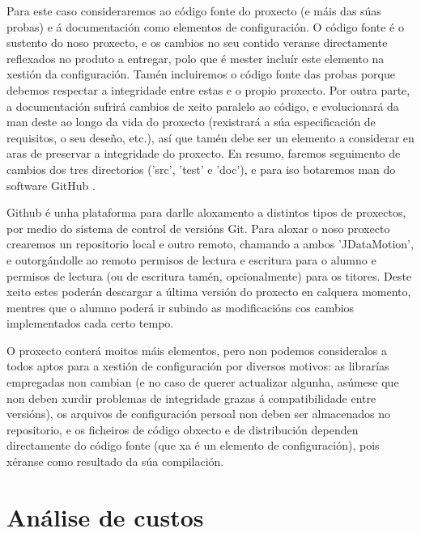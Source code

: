 Para este caso consideraremos ao código fonte do proxecto (e máis das súas probas) e á documentación como elementos de configuración. O código fonte é o sustento do noso proxecto, e os cambios no seu contido veranse directamente reflexados no produto a entregar, polo que é mester incluír este elemento na xestión da configuración. Tamén incluiremos o código fonte das probas porque debemos respectar a integridade entre estas e o propio proxecto. Por outra parte, a documentación sufrirá cambios de xeito paralelo ao código, e evolucionará da man deste ao longo da vida do proxecto (rexistrará a súa especificación de requisitos, o seu deseño, etc.), así que tamén debe ser un elemento a considerar en aras de preservar a integridade do proxecto. En resumo, faremos seguimento de cambios dos tres directorios ('src', 'test' e 'doc'), e para iso botaremos man do software GitHub \cite{github}.

Github é unha plataforma para darlle aloxamento a distintos tipos de proxectos, por medio do sistema de control de versións Git. Para aloxar o noso proxecto crearemos un repositorio local e outro remoto, chamando a ambos 'JDataMotion', e outorgándolle ao remoto permisos de lectura e escritura para o alumno e permisos de lectura (ou de escritura tamén, opcionalmente) para os titores. Deste xeito estes poderán descargar a última versión do proxecto en calquera momento, mentres que o alumno poderá ir subindo as modificacións cos cambios implementados cada certo tempo.

O proxecto conterá moitos máis elementos, pero non podemos consideralos a todos aptos para a xestión de configuración por diversos motivos: as librarías empregadas non cambian (e no caso de querer actualizar algunha, asúmese que non deben xurdir problemas de integridade grazas á compatibilidade entre versións), os arquivos de configuración persoal non deben ser almacenados no repositorio, e os ficheiros de código obxecto e de distribución dependen directamente do código fonte (que xa é un elemento de configuración), pois xéranse como resultado da súa compilación.

\section{Análise de custos}

